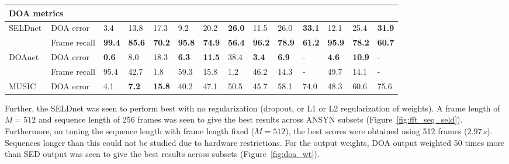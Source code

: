 \documentclass[journal]{IEEEtran}
\begin{document}
\begin{table*}[!htb]
\begin{tabular}{l|l|lll|lll|lll|lll|}
\multicolumn{14}{l}{DOA metrics} \\ \hline
SELDnet & DOA error & 3.4 & 13.8 & 17.3 & 9.2 & 20.2 & \bf26.0 & 11.5 & 26.0 & \bf33.1 & 12.1 & 25.4 & \bf31.9 \\
 & Frame recall & \bf99.4 & \bf85.6 & \bf70.2 & \bf95.8 & \bf74.9 & \bf56.4 & \bf96.2 & \bf78.9 & \bf61.2 & \bf95.9 & \bf78.2 & \bf60.7 \\\cline{2-14}
DOAnet~\cite{Adavanne2018_EUSIPCO} & DOA error & \bf0.6 & 8.0 & 18.3 & \bf6.3 &\bf 11.5 & 38.4 & \bf3.4 & \bf6.9 & - & \bf4.6 & \bf10.9 & - \\
 & Frame recall & 95.4 & 42.7 & 1.8 & 59.3 & 15.8 & 1.2 & 46.2 & 14.3 & - & 49.7 & 14.1 & - \\\cline{2-14}
 
MUSIC & DOA error & 4.1 & \bf7.2 & \bf15.8 & 40.2 & 47.1 & 50.5 & 45.7 & 58.1 & 74.0 & 48.3 & 60.6 & 75.6
\end{tabular}

\end{table*}



Further, the SELDnet was seen to perform best with no regularization (dropout, or L1 or L2 regularization of weights). A frame length of $M=512$ and sequence length of 256 frames was seen to give the best results across ANSYN subsets (Figure~\ref{fig:fft_seq_seld}). Furthermore, on tuning the sequence length with frame length fixed ($M=512$), the best scores were obtained using 512 frames ($2.97\,s$). Sequences longer than this could not be studied due to hardware restrictions. For the output weights, DOA output weighted 50 times more than SED output was seen to give the best results across subsets (Figure~\ref{fig:doa_wt}). 
\end{document}
